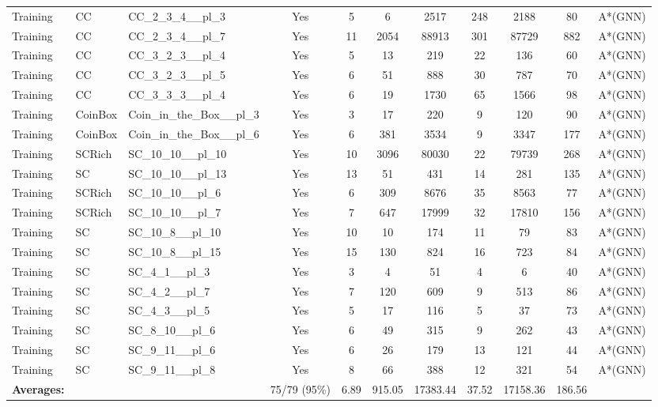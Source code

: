 \documentclass{article}
\begin{document}
\begin{tabular}{lllcccccccc}
Training & CC & CC\_2\_3\_4\_\_pl\_3 & Yes & 5 & 6 & 2517 & 248 & 2188 & 80 & A*(GNN) \\
Training & CC & CC\_2\_3\_4\_\_pl\_7 & Yes & 11 & 2054 & 88913 & 301 & 87729 & 882 & A*(GNN) \\
Training & CC & CC\_3\_2\_3\_\_pl\_4 & Yes & 5 & 13 & 219 & 22 & 136 & 60 & A*(GNN) \\
Training & CC & CC\_3\_2\_3\_\_pl\_5 & Yes & 6 & 51 & 888 & 30 & 787 & 70 & A*(GNN) \\
Training & CC & CC\_3\_3\_3\_\_pl\_4 & Yes & 6 & 19 & 1730 & 65 & 1566 & 98 & A*(GNN) \\
Training & CoinBox & Coin\_in\_the\_Box\_\_pl\_3 & Yes & 3 & 17 & 220 & 9 & 120 & 90 & A*(GNN) \\
Training & CoinBox & Coin\_in\_the\_Box\_\_pl\_6 & Yes & 6 & 381 & 3534 & 9 & 3347 & 177 & A*(GNN) \\
Training & SCRich & SC\_10\_10\_\_pl\_10 & Yes & 10 & 3096 & 80030 & 22 & 79739 & 268 & A*(GNN) \\
Training & SC & SC\_10\_10\_\_pl\_13 & Yes & 13 & 51 & 431 & 14 & 281 & 135 & A*(GNN) \\
Training & SCRich & SC\_10\_10\_\_pl\_6 & Yes & 6 & 309 & 8676 & 35 & 8563 & 77 & A*(GNN) \\
Training & SCRich & SC\_10\_10\_\_pl\_7 & Yes & 7 & 647 & 17999 & 32 & 17810 & 156 & A*(GNN) \\
Training & SC & SC\_10\_8\_\_pl\_10 & Yes & 10 & 10 & 174 & 11 & 79 & 83 & A*(GNN) \\
Training & SC & SC\_10\_8\_\_pl\_15 & Yes & 15 & 130 & 824 & 16 & 723 & 84 & A*(GNN) \\
Training & SC & SC\_4\_1\_\_pl\_3 & Yes & 3 & 4 & 51 & 4 & 6 & 40 & A*(GNN) \\
Training & SC & SC\_4\_2\_\_pl\_7 & Yes & 7 & 120 & 609 & 9 & 513 & 86 & A*(GNN) \\
Training & SC & SC\_4\_3\_\_pl\_5 & Yes & 5 & 17 & 116 & 5 & 37 & 73 & A*(GNN) \\
Training & SC & SC\_8\_10\_\_pl\_6 & Yes & 6 & 49 & 315 & 9 & 262 & 43 & A*(GNN) \\
Training & SC & SC\_9\_11\_\_pl\_6 & Yes & 6 & 26 & 179 & 13 & 121 & 44 & A*(GNN) \\
Training & SC & SC\_9\_11\_\_pl\_8 & Yes & 8 & 66 & 388 & 12 & 321 & 54 & A*(GNN) \\
\textbf{Averages:} & & & 75/79 (95\%) & 6.89 & 915.05 & 17383.44 & 37.52 & 17158.36 & 186.56 & \\
\bottomrule
\end{tabular}
\newpage
\end{document}
